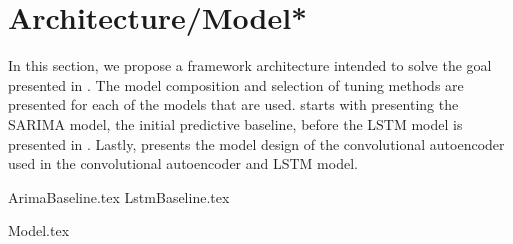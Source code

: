 \chapter{Architecture/Model*}
\label{section:Architecture}

In this section, we propose a framework architecture intended to solve the goal presented in .
The model composition and selection of tuning methods are presented for each of the models that are used.
 starts with presenting the SARIMA model, the initial predictive baseline,
before the LSTM model is presented in .
Lastly,  presents the model design of the convolutional autoencoder used in the
convolutional autoencoder and LSTM model.


{ArimaBaseline.tex}
{LstmBaseline.tex}

{Model.tex}
